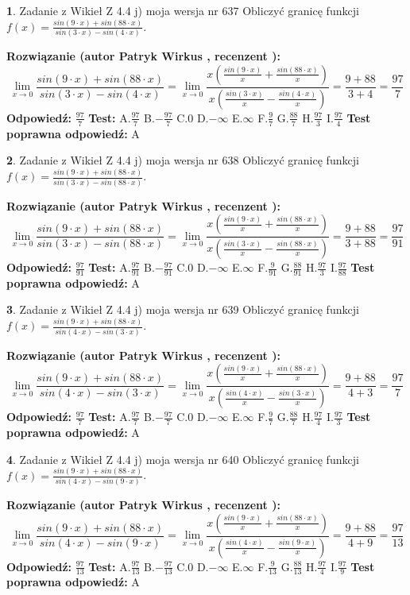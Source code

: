 \documentclass[12pt, a4paper]{article}
\theoremstyle{definition} %
\newtheorem{zad}{}
\newcommand{\zadStart}[1]{\begin{zad}#1\newline}
\newcommand{\zadStop}{\end{zad}}
\newcommand{\rozwStart}[2]{\noindent \textbf{Rozwiązanie (autor #1 , recenzent #2): }\newline}
\newcommand{\rozwStop}{\newline}
\newcommand{\odpStart}{\noindent \textbf{Odpowiedź:}\newline}
\newcommand{\odpStop}{\newline}
\newcommand{\testStart}{\noindent \textbf{Test:}\newline}
\newcommand{\testStop}{\newline}
\newcommand{\kluczStart}{\noindent \textbf{Test poprawna odpowiedź:}\newline}
\newcommand{\kluczStop}{\newline}
\begin{document}
\zadStart{Zadanie z Wikieł Z 4.4 j) moja wersja nr 637}
Obliczyć granicę funkcji $f(x)=\frac{sin(9\cdot x) +sin(88\cdot x)}{sin(3\cdot x) -sin(4\cdot x)}$.
\zadStop
\rozwStart{Patryk Wirkus}{}
$$\lim\limits_{x\to 0}\frac{sin(9\cdot x) +sin(88\cdot x)}{sin(3\cdot x) -sin(4\cdot x)}=\lim\limits_{x\to 0}\frac{x(\frac{sin(9\cdot x)}{x}+\frac{sin(88\cdot x)}{x})}{x(\frac{sin(3\cdot x)}{x}-\frac{sin(4\cdot x)}{x})}=\frac{9+88}{3+4} = \frac{97}{7}$$
\rozwStop
\odpStart
$\frac{97}{7}$
\odpStop
\testStart
A.$\frac{97}{7}$
B.$-\frac{97}{7}$
C.$0$
D.$-\infty$
E.$\infty$
F.$\frac{9}{7}$
G.$\frac{88}{7}$
H.$\frac{97}{3}$
I.$\frac{97}{4}$
\testStop
\kluczStart
A
\kluczStop



\zadStart{Zadanie z Wikieł Z 4.4 j) moja wersja nr 638}
Obliczyć granicę funkcji $f(x)=\frac{sin(9\cdot x) +sin(88\cdot x)}{sin(3\cdot x) -sin(88\cdot x)}$.
\zadStop
\rozwStart{Patryk Wirkus}{}
$$\lim\limits_{x\to 0}\frac{sin(9\cdot x) +sin(88\cdot x)}{sin(3\cdot x) -sin(88\cdot x)}=\lim\limits_{x\to 0}\frac{x(\frac{sin(9\cdot x)}{x}+\frac{sin(88\cdot x)}{x})}{x(\frac{sin(3\cdot x)}{x}-\frac{sin(88\cdot x)}{x})}=\frac{9+88}{3+88} = \frac{97}{91}$$
\rozwStop
\odpStart
$\frac{97}{91}$
\odpStop
\testStart
A.$\frac{97}{91}$
B.$-\frac{97}{91}$
C.$0$
D.$-\infty$
E.$\infty$
F.$\frac{9}{91}$
G.$\frac{88}{91}$
H.$\frac{97}{3}$
I.$\frac{97}{88}$
\testStop
\kluczStart
A
\kluczStop



\zadStart{Zadanie z Wikieł Z 4.4 j) moja wersja nr 639}
Obliczyć granicę funkcji $f(x)=\frac{sin(9\cdot x) +sin(88\cdot x)}{sin(4\cdot x) -sin(3\cdot x)}$.
\zadStop
\rozwStart{Patryk Wirkus}{}
$$\lim\limits_{x\to 0}\frac{sin(9\cdot x) +sin(88\cdot x)}{sin(4\cdot x) -sin(3\cdot x)}=\lim\limits_{x\to 0}\frac{x(\frac{sin(9\cdot x)}{x}+\frac{sin(88\cdot x)}{x})}{x(\frac{sin(4\cdot x)}{x}-\frac{sin(3\cdot x)}{x})}=\frac{9+88}{4+3} = \frac{97}{7}$$
\rozwStop
\odpStart
$\frac{97}{7}$
\odpStop
\testStart
A.$\frac{97}{7}$
B.$-\frac{97}{7}$
C.$0$
D.$-\infty$
E.$\infty$
F.$\frac{9}{7}$
G.$\frac{88}{7}$
H.$\frac{97}{4}$
I.$\frac{97}{3}$
\testStop
\kluczStart
A
\kluczStop



\zadStart{Zadanie z Wikieł Z 4.4 j) moja wersja nr 640}
Obliczyć granicę funkcji $f(x)=\frac{sin(9\cdot x) +sin(88\cdot x)}{sin(4\cdot x) -sin(9\cdot x)}$.
\zadStop
\rozwStart{Patryk Wirkus}{}
$$\lim\limits_{x\to 0}\frac{sin(9\cdot x) +sin(88\cdot x)}{sin(4\cdot x) -sin(9\cdot x)}=\lim\limits_{x\to 0}\frac{x(\frac{sin(9\cdot x)}{x}+\frac{sin(88\cdot x)}{x})}{x(\frac{sin(4\cdot x)}{x}-\frac{sin(9\cdot x)}{x})}=\frac{9+88}{4+9} = \frac{97}{13}$$
\rozwStop
\odpStart
$\frac{97}{13}$
\odpStop
\testStart
A.$\frac{97}{13}$
B.$-\frac{97}{13}$
C.$0$
D.$-\infty$
E.$\infty$
F.$\frac{9}{13}$
G.$\frac{88}{13}$
H.$\frac{97}{4}$
I.$\frac{97}{9}$
\testStop
\kluczStart
A
\kluczStop
\end{document}
